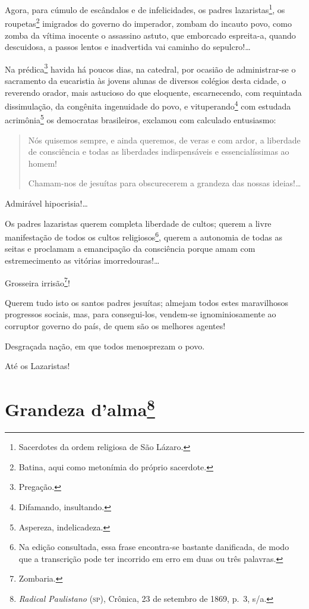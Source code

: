 Agora, para cúmulo de escândalos e de infelicidades, os padres
lazaristas\footnote{Sacerdotes da ordem religiosa de São Lázaro.}, os
roupetas\footnote{Batina, aqui como metonímia do próprio sacerdote.}
imigrados do governo do imperador, zombam do incauto povo, como zomba da
vítima inocente o assassino astuto, que emborcado espreita-a, quando
descuidosa, a passos lentos e inadvertida vai caminho do sepulcro!\ldots{}

Na prédica\footnote{Pregação.} havida há poucos dias, na catedral, por
ocasião de administrar-se o sacramento da eucaristia às jovens alunas de
diversos colégios desta cidade, o reverendo orador, mais astucioso do
que eloquente, escarnecendo, com requintada dissimulação, da congênita
ingenuidade do povo, e vituperando\footnote{Difamando, insultando.}
com estudada acrimônia\footnote{Aspereza, indelicadeza.} os democratas
brasileiros, exclamou com calculado entusiasmo:


\begin{quote}
Nós quisemos sempre, e ainda queremos, de veras e com ardor, a
liberdade de consciência e todas as liberdades indispensáveis e
essencialíssimas ao homem!

Chamam-nos de jesuítas para obscurecerem a grandeza das nossas
ideias!\ldots{}
\end{quote}

Admirável hipocrisia!\ldots{}

Os padres lazaristas querem completa liberdade de cultos; querem a livre
manifestação de todos os cultos religiosos\footnote{Na edição
  consultada, essa frase encontra-se bastante danificada, de modo que a
  transcrição pode ter incorrido em erro em duas ou três palavras.},
querem a autonomia de todas as seitas e proclamam a emancipação da
consciência porque amam com estremecimento as vitórias
imorredouras!\ldots

Grosseira irrisão\footnote{Zombaria.}!

Querem tudo isto os santos padres jesuítas; almejam todos estes
maravilhosos progressos sociais, mas, para consegui-los, vendem-se
ignominiosamente ao corruptor governo do país, de quem são os melhores
agentes!

Desgraçada nação, em que todos menosprezam o povo.

Até os Lazaristas!

\chapter{Grandeza d'alma\footnote{\emph{Radical Paulistano} (\textsc{sp}),
  Crônica, 23 de setembro de 1869, p.~3, s/a.}}

